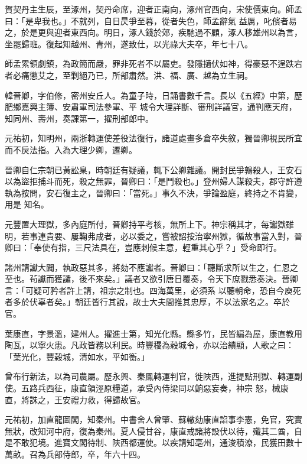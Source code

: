 \begin{pinyinscope}
 賀契丹主生辰，至涿州，契丹命席，迎者正南向，涿州官西向，宋使價東向。師孟曰：「是卑我也。」不就列，自日昃爭至暮，從者失色，師孟辭氣
 益厲，叱儐者易之，於是更與迎者東西向。明日，涿人錢於郊，疾馳過不顧，涿人移雄州以為言，坐罷歸班。復起知越州、青州，遂致仕，以光祿大夫卒，年七十八。



 師孟累領劇鎮，為政簡而嚴，罪非死者不以屬吏。發隱擿伏如神，得豪惡不逞跌宕者必痛懲艾之，至剿絕乃已，所部肅然。洪、福、廣、越為立生祠。



 韓晉卿，字伯修，密州安丘人。為童子時，日誦書數千言。長以《五經》中第，歷肥鄉嘉興主簿、安肅軍司法參軍、平
 城令大理詳斷、審刑詳議官，通判應天府，知同州、壽州，奏課第一，擢刑部郎中。



 元祐初，知明州，兩浙轉運使差役法復行，諸道處畫多倉卒失敘，獨晉卿視民所宜而不戾法指。入為大理少卿，遷卿。



 晉卿自仁宗朝已黃訟臬，時朝廷有疑議，輒下公卿雜議。開封民爭鶉殺人，王安石以為盜拒捕斗而死，殺之無罪，晉卿曰：「是鬥殺也。」登州婦人謀殺夫，郡守許遵執為按問，安石復主之，晉卿曰：「當死。」事久不決，爭論盈庭，終持之不肯變，用是
 知名。



 元豐置大理獄，多內庭所付，晉卿持平考核，無所上下。神宗稱其才，每讞獄雖明，若事連貴要、屢鞠弗成者，必以委之，嘗被詔按治寧州獄，循故事當入對，晉卿曰：「奉使有指，三尺法具在，豈應刺候主意，輕重其心乎？」受命即行。



 諸州請讞大闢，執政惡其多，將劾不應讞者。晉卿曰：「聽斷求所以生之，仁恩之至也。茍讞而獲譴，後不來矣。」議者又欲引唐日覆奏，令天下庶戮悉奏決。晉卿言：「可疑可矜者許上請，祖宗之制也。四海萬里，必須系
 以聽朝命，恐自今庾死者多於伏辜者矣。」朝廷皆行其說，故士大夫間推其忠厚，不以法家名之。卒於官。



 葉康直，字景溫，建州人。擢進士第，知光化縣。縣多竹，民皆編為屋，康直教用陶瓦，以寧火患。凡政皆務以利民。時豐稷為穀城令，亦以治績顯，人歌之曰：「葉光化，豐穀城，清如水，平如衡。」



 曾布行新法，以為司農屬。歷永興、秦鳳轉運判官，徙陜西，進提點刑獄、轉運副使。五路兵西征，康直領涇原糧道，承受內侍梁同以餉惡妄奏，神宗
 怒，械康直，將誅之，王安禮力救，得歸故官。



 元祐初，加直龍圖閣，知秦州。中書舍人曾肇、蘇轍劾康直諂事李憲，免官，究實無狀，改知河中府，復為秦州。夏人侵甘谷，康直戒諸將設伏以待，殲其二酋，自是不敢犯境。進寶文閣待制、陜西都運使。以疾請知亳州，通浚積潦，民獲田數十萬畝。召為兵部侍郎，卒，年六十四。



\end{pinyinscope}